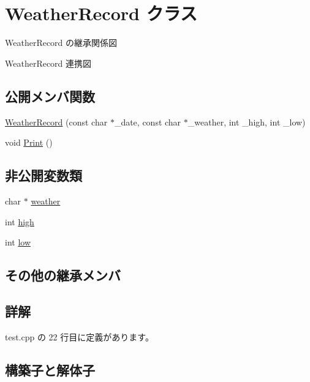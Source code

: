 \hypertarget{class_weather_record}{}\section{Weather\+Record クラス}
\label{class_weather_record}


Weather\+Record の継承関係図


Weather\+Record 連携図
\subsection*{公開メンバ関数}
\begin{DoxyCompactItemize}
\item 
\hyperlink{class_weather_record_a6a4edf430381ee7ac701876f787c7633}{Weather\+Record} (const char $\ast$\+\_\+date, const char $\ast$\+\_\+weather, int \+\_\+high, int \+\_\+low)
\item 
void \hyperlink{class_weather_record_a824790f08728d4deb81dfcbaec5a76ba}{Print} ()
\end{DoxyCompactItemize}
\subsection*{非公開変数類}
\begin{DoxyCompactItemize}
\item 
char $\ast$ \hyperlink{class_weather_record_a3b9b2139f84c02e1ba36b1bee333e057}{weather}
\item 
int \hyperlink{class_weather_record_ab1f968211ccc7fe600f76d31f3b0edc9}{high}
\item 
int \hyperlink{class_weather_record_a16a7592e80388a4b2091c027cd18aed3}{low}
\end{DoxyCompactItemize}
\subsection*{その他の継承メンバ}


\subsection{詳解}


 test.\+cpp の 22 行目に定義があります。



\subsection{構築子と解体子}
\mbox{\label{class_weather_record_a6a4edf430381ee7ac701876f787c7633}} 
